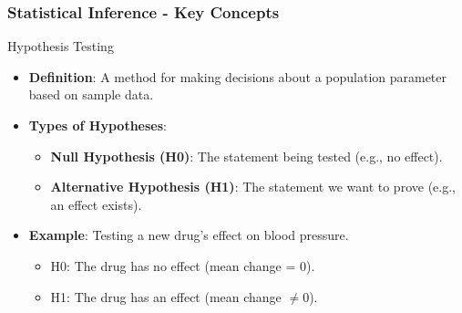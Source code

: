 \documentclass[aspectratio=169]{beamer}
\begin{document}
\begin{frame}[fragile]
    \frametitle{Statistical Inference - Key Concepts}
    \begin{block}{Hypothesis Testing}
        \begin{itemize}
            \item \textbf{Definition}: A method for making decisions about a population parameter based on sample data.
            \item \textbf{Types of Hypotheses}:
                \begin{itemize}
                    \item \textbf{Null Hypothesis (H0)}: The statement being tested (e.g., no effect).
                    \item \textbf{Alternative Hypothesis (H1)}: The statement we want to prove (e.g., an effect exists).
                \end{itemize}
            \item \textbf{Example}: Testing a new drug's effect on blood pressure.
                \begin{itemize}
                    \item H0: The drug has no effect (mean change = 0).
                    \item H1: The drug has an effect (mean change $\neq 0$).
                \end{itemize}
        \end{itemize}
    \end{block}
\end{frame}
\end{document}
